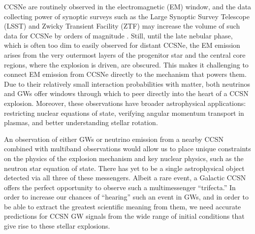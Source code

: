 \documentclass[twocolumn,times]{aastex62}  %
\begin{document}
CCSNe are routinely observed in the electromagnetic (EM) window, and the data collecting power of synoptic surveys such as the Large Synoptic Survey Telescope (LSST) and Zwicky Transient Facility (ZTF) may increase the volume of such data for CCSNe by orders of magnitude \citep{ivezic:2008,bellm:2019}.
Still, until the late nebular phase, which is often too dim to easily observed for distant CCSNe, the EM emission arises from the very outermost layers of the progenitor star and the central core regions, where the explosion is driven, are obscured. 
This makes it challenging to connect EM emission from CCSNe directly to the mechanism that powers them.
Due to their relatively small interaction probabilities with matter, both neutrinos and GWs offer windows through which to peer directly into the heart of a CCSN explosion.  
Moreover, these observations have broader astrophysical applications: restricting nuclear equations of state, verifying angular momentum transport in plasmas, and better understanding stellar rotation.

An observation of either GWs or neutrino emission from a nearby CCSN combined with multiband observations would allow us to place unique constraints on the physics of the explosion mechanism and key nuclear physics, such as the neutron star equation of state.  
There has yet to be a single astrophysical object detected via all three of these messengers.  
Albeit a rare event, a Galactic CCSN offers the perfect opportunity to observe such a multimessenger ``trifecta.''  
In order to increase our chances of ``hearing'' such an event in GWs, and in order to be able to extract the greatest scientific meaning from them, we need accurate predictions for CCSN GW signals from the wide range of initial conditions that give rise to these stellar explosions.
\end{document}
